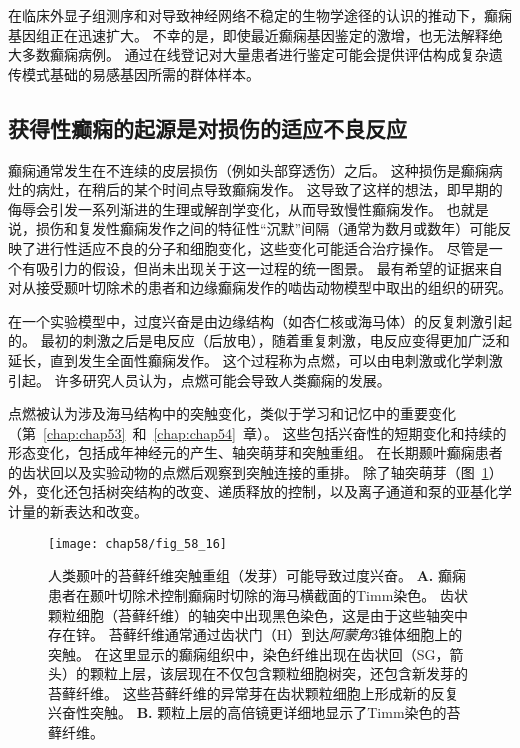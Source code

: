 在临床外显子组测序和对导致神经网络不稳定的生物学途径的认识的推动下，癫痫基因组正在迅速扩大。
不幸的是，即使最近癫痫基因鉴定的激增，也无法解释绝大多数癫痫病例。
通过在线登记对大量患者进行鉴定可能会提供评估构成复杂遗传模式基础的易感基因所需的群体样本。



\subsection{获得性癫痫的起源是对损伤的适应不良反应}

癫痫通常发生在不连续的皮层损伤（例如头部穿透伤）之后。
这种损伤是癫痫病灶的病灶，在稍后的某个时间点导致癫痫发作。
这导致了这样的想法，即早期的侮辱会引发一系列渐进的生理或解剖学变化，从而导致慢性癫痫发作。
也就是说，损伤和复发性癫痫发作之间的特征性“沉默”间隔（通常为数月或数年）可能反映了进行性适应不良的分子和细胞变化，这些变化可能适合治疗操作。
尽管是一个有吸引力的假设，但尚未出现关于这一过程的统一图景。
最有希望的证据来自对从接受颞叶切除术的患者和边缘癫痫发作的啮齿动物模型中取出的组织的研究。


在一个实验模型中，过度兴奋是由边缘结构（如杏仁核或海马体）的反复刺激引起的。
最初的刺激之后是电反应（后放电），随着重复刺激，电反应变得更加广泛和延长，直到发生全面性癫痫发作。
这个过程称为点燃，可以由电刺激或化学刺激引起。
许多研究人员认为，点燃可能会导致人类癫痫的发展。


点燃被认为涉及海马结构中的突触变化，类似于学习和记忆中的重要变化（第~\ref{chap:chap53}~和~\ref{chap:chap54}~章）。
这些包括兴奋性的短期变化和持续的形态变化，包括成年神经元的产生、轴突萌芽和突触重组。
在长期颞叶癫痫患者的齿状回以及实验动物的点燃后观察到突触连接的重排。
除了轴突萌芽（图~\ref{fig:58_16}）外，变化还包括树突结构的改变、递质释放的控制，以及离子通道和泵的亚基化学计量的新表达和改变。


\begin{figure}[htbp]
	\centering
	\texttt{[image: chap58/fig\_58\_16]}
	\caption{人类颞叶的苔藓纤维突触重组（发芽）可能导致过度兴奋\cite{sutula1989mossy}。
		\textbf{A.} 癫痫患者在颞叶切除术控制癫痫时切除的海马横截面的Timm染色。
		齿状颗粒细胞（苔藓纤维）的轴突中出现黑色染色，这是由于这些轴突中存在锌。
		苔藓纤维通常通过齿状门（H）到达\textit{阿蒙角}3锥体细胞上的突触。
		在这里显示的癫痫组织中，染色纤维出现在齿状回（SG，箭头）的颗粒上层，该层现在不仅包含颗粒细胞树突，还包含新发芽的苔藓纤维。
		这些苔藓纤维的异常芽在齿状颗粒细胞上形成新的反复兴奋性突触。
		\textbf{B.} 颗粒上层的高倍镜更详细地显示了Timm染色的苔藓纤维。}
	\label{fig:58_16}
\end{figure}


